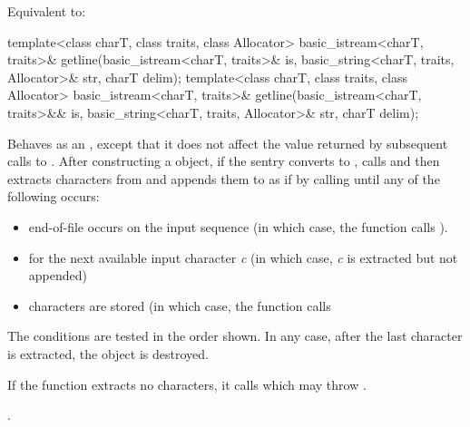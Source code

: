 \begin{itemdescr}
\pnum
\effects
Equivalent to: 
\end{itemdescr}

%
\begin{itemdecl}
template<class charT, class traits, class Allocator>
  basic_istream<charT, traits>&
    getline(basic_istream<charT, traits>& is,
            basic_string<charT, traits, Allocator>& str,
            charT delim);
template<class charT, class traits, class Allocator>
  basic_istream<charT, traits>&
    getline(basic_istream<charT, traits>&& is,
            basic_string<charT, traits, Allocator>& str,
            charT delim);
\end{itemdecl}

\begin{itemdescr}
\pnum
\effects
Behaves as an ,
except that it does not affect the value returned by subsequent calls to
.
After constructing a
object, if the sentry converts to , calls
and then extracts characters from  and appends them
to  as if by calling
until any of the following occurs:
\begin{itemize}
\item
end-of-file occurs on the input sequence
(in which case, the
function calls
).
\item
{}
for the next available input character
\textit{c}
(in which case,
\textit{c}
is extracted but not appended)
\item
{}
characters are stored
(in which case,
the function calls
\end{itemize}

\pnum
The conditions are tested in the order shown.
In any case,
after the last character is extracted, the
object is destroyed.

\pnum
If the function extracts no characters, it calls
which may throw
.

\pnum
\returns
{}.
\end{itemdescr}

